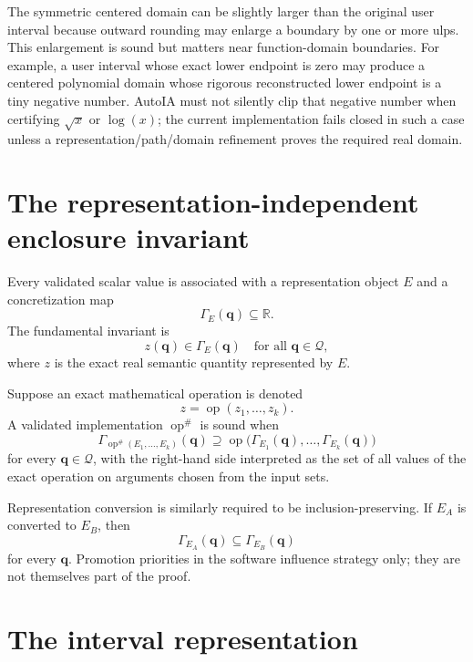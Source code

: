 \documentclass[11pt]{article}
\newcommand{\R}{\mathbb{R}}
\newcommand{\Qdom}{\mathcal{Q}}
\newcommand{\qv}{\mathbf{q}}
\begin{document}
The symmetric centered domain can be slightly larger than the original user
interval because outward rounding may enlarge a boundary by one or more ulps.
This enlargement is sound but matters near function-domain boundaries.  For
example, a user interval whose exact lower endpoint is zero may produce a
centered polynomial domain whose rigorous reconstructed lower endpoint is a tiny
negative number.  AutoIA must not silently clip that negative number when
certifying \(\sqrt{x}\) or \(\log(x)\); the current implementation fails closed
in such a case unless a representation/path/domain refinement proves the required
real domain.

\section{The representation-independent enclosure invariant}

Every validated scalar value is associated with a representation object \(E\)
and a concretization map
\[
  \Gamma_E(\qv)\subseteq\R.
\]
The fundamental invariant is
\[
  \boxed{
  z(\qv)\in\Gamma_E(\qv)
  \quad\text{for all }\qv\in\Qdom,
  }
\]
where \(z\) is the exact real semantic quantity represented by \(E\).

Suppose an exact mathematical operation is denoted
\[
  z=\operatorname{op}(z_1,\ldots,z_k).
\]
A validated implementation \(\operatorname{op}^{\#}\) is sound when
\[
  \boxed{
  \Gamma_{\operatorname{op}^{\#}(E_1,\ldots,E_k)}(\qv)
  \supseteq
  \operatorname{op}\bigl(
      \Gamma_{E_1}(\qv),\ldots,\Gamma_{E_k}(\qv)
  \bigr)
  }
\]
for every \(\qv\in\Qdom\), with the right-hand side interpreted as the set of
all values of the exact operation on arguments chosen from the input sets.

Representation conversion is similarly required to be inclusion-preserving.  If
\(E_A\) is converted to \(E_B\), then
\[
  \Gamma_{E_A}(\qv)\subseteq\Gamma_{E_B}(\qv)
\]
for every \(\qv\).  Promotion priorities in the software influence strategy only;
they are not themselves part of the proof.

\section{The interval representation}
\end{document}
